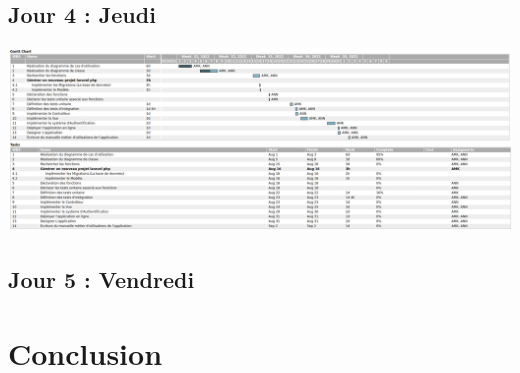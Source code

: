 \documentclass[12pt,a4paper]{article}
\begin{document}
\subsection{Jour 4 : Jeudi}
\includegraphics[scale=0.23]{images/jour4.png}
\subsection{Jour 5 : Vendredi}

\section{Conclusion}
\end{document}
